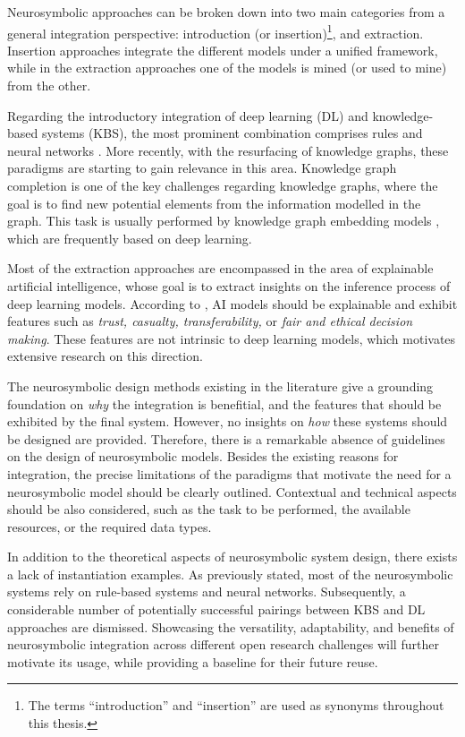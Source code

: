 Neurosymbolic approaches can be broken down into two main categories from a general integration perspective: introduction (or insertion)\footnote{The terms ``introduction'' and ``insertion'' are used as synonyms throughout this thesis.}, and extraction. Insertion approaches integrate the different models under a unified framework, while in the extraction approaches one of the models is mined (or used to mine) from the other.

Regarding the introductory integration of deep learning (DL) and knowledge-based systems (KBS), the most prominent combination comprises rules and neural networks \citep{daniele_knowledge_2019,hatzilygeroudis_integrated_2010}. More recently, with the resurfacing of knowledge graphs, these paradigms are starting to gain relevance in this area. Knowledge graph completion \citep{nickel_review_ml_kg_2016,wang_kge_survey_2017} is one of the key challenges regarding knowledge graphs, where the goal is to find new potential elements from the information modelled in the graph. This task is usually performed by knowledge graph embedding models \citep{transe,distmult,crosse}, which are frequently based on deep learning. 

Most of the extraction approaches are encompassed in the area of explainable artificial intelligence, whose goal is to extract insights on the inference process of deep learning models. According to \cite{burkart_survey_2021}, AI models should be explainable and exhibit features such as \textit{trust, casualty, transferability,} or \textit{fair and ethical decision making}. These features are not intrinsic to deep learning models, which motivates extensive research on this direction.

The neurosymbolic design methods existing in the literature give a grounding foundation on \textit{why} the integration is benefitial, and the features that should be exhibited by the final system. However, no insights on \textit{how} these systems should be designed are provided. Therefore, there is a remarkable absence of guidelines on the design of neurosymbolic models. Besides the existing reasons for integration, the precise limitations of the paradigms that motivate the need for a neurosymbolic model should be clearly outlined. Contextual and technical aspects should be also considered, such as the task to be performed, the available resources, or the required data types.

In addition to the theoretical aspects of neurosymbolic system design, there exists a lack of instantiation examples. As previously stated, most of the neurosymbolic systems rely on rule-based systems and neural networks. Subsequently, a considerable number of potentially successful pairings between KBS and DL approaches are dismissed. Showcasing the versatility, adaptability, and benefits of neurosymbolic integration across different open research challenges will further motivate its usage, while providing a baseline for their future reuse. 

